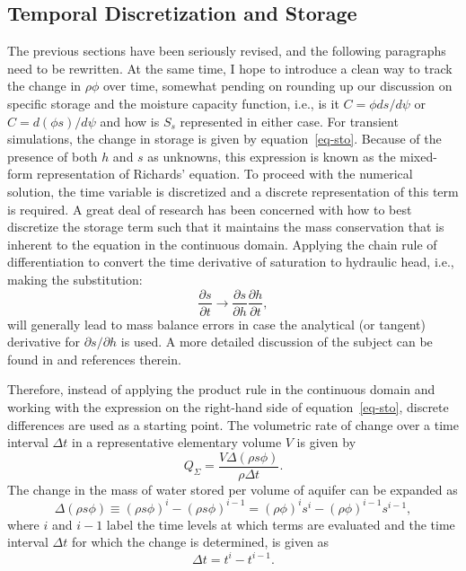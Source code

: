 \documentclass[fleqn]{article}
\begin{document}
\subsection{Temporal Discretization and Storage}
\label{sec-temp-disc-sto}
{\color{blue}
The previous sections have been seriously revised, and the following
paragraphs need to be rewritten. At the same time, I hope to introduce
a clean way to track the change in $\rho\phi$ over time, somewhat
pending on rounding up our discussion on specific storage and the
moisture capacity function, i.e., is it $C = \phi ds/d\psi$ or 
$C = d (\phi s)/d\psi$ and how is $S_s$ represented in either case.
}
For transient simulations, the change in storage is given by
equation~\ref{eq-sto}. Because of the presence of both $h$ and
$s$ as unknowns, this expression is known as the mixed-form
representation of Richards' equation. To proceed with the
numerical solution, the time variable is discretized and a
discrete representation of this term is required. 
A great deal of research has been concerned with how to 
best discretize the storage term such that it maintains
the mass conservation that is inherent to the equation in
the continuous domain. Applying the chain rule of differentiation
to convert the time derivative of saturation to hydraulic head,
i.e., making the substitution:
\begin{equation}
  \frac{\partial s}{\partial t} \rightarrow
  \frac{\partial s}{\partial h}
  \frac{\partial h}{\partial t},
  \label{eq-sat-chain-rule}
\end{equation}
will generally lead to mass balance errors in case the analytical
(or tangent) derivative for $\partial s/\partial h$ is used. 
A more detailed discussion of the subject can be found in
\cite{rathfelder-1994} and references therein.

Therefore, instead of applying the product rule in the continuous 
domain and working with the expression on the right-hand side of 
equation~\ref{eq-sto}, discrete differences are used as a
starting point. The volumetric rate of change over a time interval 
$\Delta t$ in a representative elementary volume $V$ is given
by
\begin{equation}
  Q_{\Sigma} = \frac{ V \Delta\left ( \rho s \phi \right )}{\rho \Delta t}.
\end{equation}
The change in the mass of water stored per volume of aquifer can be
expanded as
\begin{equation}
  \Delta \left ( \rho s \phi \right ) \equiv
  \left ( \rho s \phi \right )^{i} - 
  \left ( \rho s \phi \right )^{i-1} =
  \left ( \rho \phi \right )^{i} s^{i} - 
  \left ( \rho \phi \right )^{i-1} s^{i-1},
  \label{eq-delta_sto}
\end{equation}
where $i$ and $i-1$ label the time levels at which terms
are evaluated and the time interval $\Delta t$ for which the 
change is determined, is given as
\begin{equation}
  \Delta t = t^i - t^{i-1}.
\end{equation}
\end{document}
